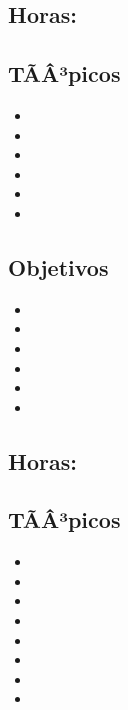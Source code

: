 \subsection*{Horas: \ARDOSHours}

\subsection*{TÃÂ³picos}
\begin{itemize}
	\item \ARDOSTopicBits
	\item \ARDOSTopicRepresentacion
	\item \ARDOSTopicSistemas
	\item \ARDOSTopicRepresentacionde
	\item \ARDOSTopicRepresentaciondedatos
	\item \ARDOSTopicRepresentacionderegistros
\end{itemize}

\subsection*{Objetivos}
\begin{itemize}
	\item \ARDOSObjUNO
	\item \ARDOSObjDOS
	\item \ARDOSObjTRES
	\item \ARDOSObjCUATRO
	\item \ARDOSObjCINCO
	\item \ARDOSObjSEIS
\end{itemize}

\subsection{\ARTRESDef}\label{sec:BOK-AR3}
\subsection*{Horas: \ARTRESHours}

\subsection*{TÃÂ³picos}
\begin{itemize}
	\item \ARTRESTopicOrganizacion
	\item \ARTRESTopicUnidad
	\item \ARTRESTopicConjuntos
	\item \ARTRESTopicLenguaje
	\item \ARTRESTopicFormatos
	\item \ARTRESTopicModos
	\item \ARTRESTopicLlamada
	\item \ARTRESTopicEntradas
\end{itemize}


